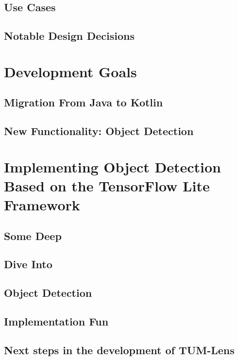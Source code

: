 \documentclass[
			   fontsize=11pt,
               paper=a4,
               bibliography=totoc,
               idxtotoc,
               headsepline,
               footsepline,
               footinclude=false,
               BCOR=12mm,
               DIV=13,
               openany,   %
               ]
               {scrbook}
\begin{document}
\subsection{Use Cases}

\subsection{Notable Design Decisions}

\section{Development Goals}

\subsection{Migration From Java to Kotlin}

\subsection{New Functionality: Object Detection}

\section{Implementing Object Detection Based on the TensorFlow Lite Framework}

\subsection{Some Deep}
\subsection{Dive Into}
\subsection{Object Detection}
\subsection{Implementation Fun}

\subsection{Next steps in the development of TUM-Lens}

\end{document}
